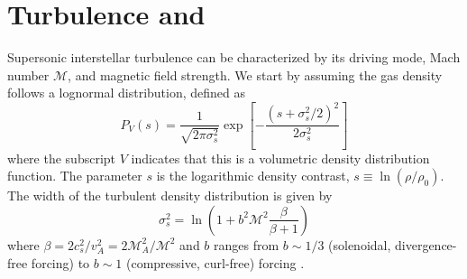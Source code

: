 % 

%



\section{Turbulence and \formaldehyde}
Supersonic interstellar turbulence can be characterized by its driving mode,
Mach number $\mathcal{M}$, and magnetic field strength. 
We start by assuming the gas density follows a lognormal distribution, defined
as 
\begin{equation}
    \label{eqn:lognormal}
    P_V(s) = \frac{1}{\sqrt{2 \pi \sigma_s^2}} \exp\left[-\frac{(s+\sigma_s^2/2)^2}{2 \sigma_s^2}\right]
\end{equation}
\citep{Padoan2011b,Molina2012a}
where the subscript $V$ indicates that this is a volumetric density
distribution function.  The parameter $s$ is the logarithmic
density contrast, $s\equiv\ln(\rho/\rho_0)$.
The width of the turbulent density distribution
is given by
\begin{equation}
    \label{eqn:sigmas}
    \sigma_s^2 = \ln\left(1+b^2 \mathcal{M}^2 \frac{\beta}{\beta+1}\right)
\end{equation}
where $\beta= 2 c_s^2/v_A^2 = 2 \mathcal{M}_A^2/\mathcal{M}^2$ and $b$ ranges
from $b\sim1/3$ (solenoidal, divergence-free forcing) to $b\sim1$ (compressive, curl-free)
forcing \citep{Federrath2010a}.  


